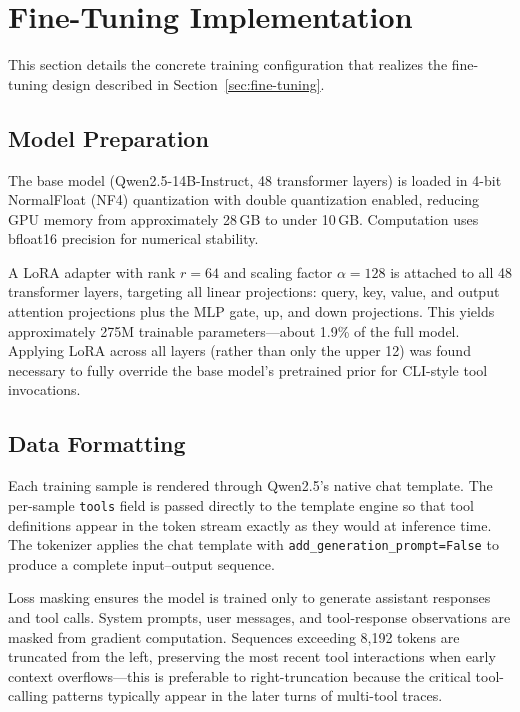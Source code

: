 \section{Fine-Tuning Implementation}
\label{sec:ft-implementation}

This section details the concrete training configuration that realizes the fine-tuning design described in Section~\ref{sec:fine-tuning}.

\subsection{Model Preparation}

The base model (Qwen2.5-14B-Instruct, 48 transformer layers) is loaded in 4-bit NormalFloat (NF4) quantization with double quantization enabled, reducing GPU memory from approximately 28\,GB to under 10\,GB. Computation uses bfloat16 precision for numerical stability.

A LoRA adapter with rank $r{=}64$ and scaling factor $\alpha{=}128$ is attached to all 48 transformer layers, targeting all linear projections: query, key, value, and output attention projections plus the MLP gate, up, and down projections. This yields approximately 275M trainable parameters---about 1.9\% of the full model. Applying LoRA across all layers (rather than only the upper 12) was found necessary to fully override the base model's pretrained prior for CLI-style tool invocations.

\subsection{Data Formatting}

Each training sample is rendered through Qwen2.5's native chat template. The per-sample \texttt{tools} field is passed directly to the template engine so that tool definitions appear in the token stream exactly as they would at inference time. The tokenizer applies the chat template with \texttt{add\_generation\_prompt=False} to produce a complete input--output sequence.

Loss masking ensures the model is trained only to generate assistant responses and tool calls. System prompts, user messages, and tool-response observations are masked from gradient computation. Sequences exceeding 8{,}192 tokens are truncated from the left, preserving the most recent tool interactions when early context overflows---this is preferable to right-truncation because the critical tool-calling patterns typically appear in the later turns of multi-tool traces.

